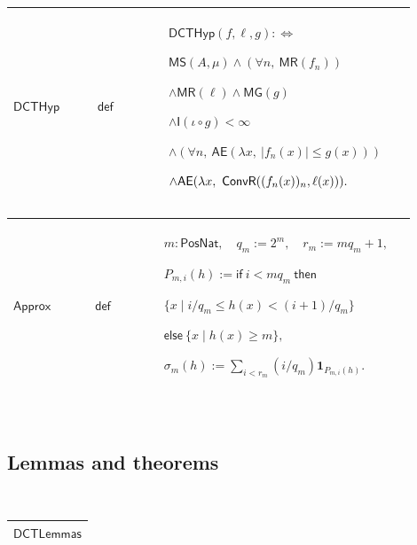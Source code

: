 \documentclass[12pt,reqno]{amsart}
\theoremstyle{blueplain}
\numberwithin{equation}{section}
\newlength{\DCTOneColumnBody}
\begin{document}
{\scriptsize \setlength{\parskip}{0pt}\nointerlineskip
\noindent 
\begin{tabular}{|@{}>{\centering\arraybackslash}m{0.19251\linewidth}|>{\centering\arraybackslash}m{0.16845\linewidth}|>{\centering\arraybackslash}m{0.53904\linewidth}|}
\hline
\hypertarget{dctdef:DCTHyp}{$\displaystyle \mathsf{DCTHyp}$} & $%
\displaystyle \mathsf{def}$ & $\displaystyle \mathsf{DCTHyp}%
(f,\ell,g):\Longleftrightarrow$\par$\displaystyle \mathsf{MS}%
(A,\mu)\land(\forall n,\ \mathsf{MR}(f_n))$\par$\displaystyle \land\mathsf{MR%
}(\ell)\land\mathsf{MG}(g)$\par$\displaystyle \land\mathsf{I}(\iota\circ
g)<\infty$\par$\displaystyle \land(\forall n,\ \mathsf{AE}(\lambda x,\
|f_n(x)|\le g(x)))$\par$\displaystyle \land\mathsf{AE}(\lambda x,\ \mathsf{%
ConvR}((f_n(x))_n,\ell(x))).$ \\ \hline
\end{tabular}%
}

{\scriptsize \setlength{\parskip}{0pt}\nointerlineskip
\noindent 
\begin{tabular}{|@{}>{\centering\arraybackslash}m{0.19251\linewidth}|>{\centering\arraybackslash}m{0.16845\linewidth}|>{\centering\arraybackslash}m{0.53904\linewidth}|}
\hline
\hypertarget{dctdef:Approx}{$\displaystyle \mathsf{Approx}$} & $%
\displaystyle \mathsf{def}$ & $\displaystyle m:\mathsf{PosNat},\quad
q_m:=2^m,\quad r_m:=mq_m+1,$\par$\displaystyle P_{m,i}(h):=\mathsf{if}\
i<mq_m\ \mathsf{then}$\par$\displaystyle \{x\mid i/q_m\le h(x)<(i+1)/q_m\}$%
\par$\displaystyle \mathsf{else}\ \{x\mid h(x)\ge m\},$\par$\displaystyle %
\sigma_m(h):=\sum_{i<r_m}(i/q_m)\mathbf{1}_{P_{m,i}(h)}.$ \\ \hline
\end{tabular}%
}

{\scriptsize \ }

\subsection{\protect\scriptsize Lemmas and theorems}

{\scriptsize {\ }}

{\scriptsize \setlength{\parskip}{0pt}\nointerlineskip
\noindent 
\begin{tabular}{|@{}>{\centering\arraybackslash}m{\DCTOneColumnBody}|}
\hline
$\displaystyle \mathsf{DCTLemmas}$ \\ \hline
\end{tabular}%
}
\end{document}
